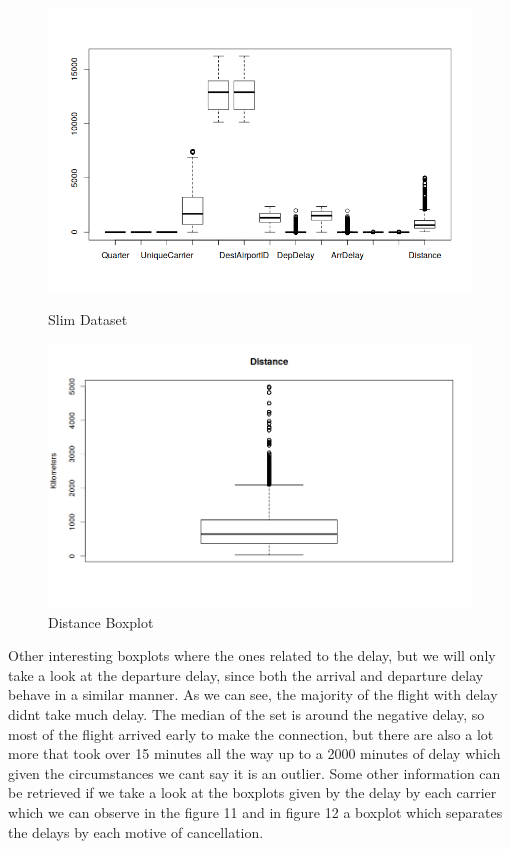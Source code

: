 \documentclass{article}
\begin{document}
    \begin{figure}
      \includegraphics[width=\linewidth]{r_plots/boxes.png}
      \caption{Slim Dataset}
      \label{fig:graph1}
      \includegraphics[width=\linewidth]{r_plots/box_distance.png}
      \caption{Distance Boxplot}
      \label{fig:graph1}
    \end{figure}

    Other interesting boxplots where the ones related to the delay, but we will only take a look at the departure delay, since both the arrival and departure delay behave in a similar manner. As we can see, the majority of the flight with delay didnt take much delay. The median of the set is around the negative delay, so most of the flight arrived early to make the connection, but there are also a lot more that took over 15 minutes all the way up to a 2000 minutes of delay which given the circumstances we cant say it is an outlier.\newline
    Some other information can be retrieved if we take a look at the boxplots given by the delay by each carrier which we can observe in the figure 11 and in figure 12 a boxplot which separates the delays by each motive of cancellation.
\end{document}
